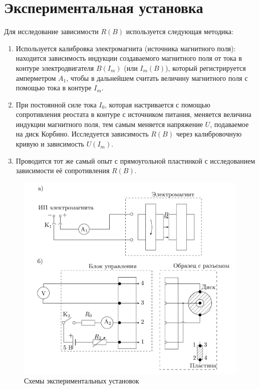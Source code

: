 \documentclass[a4paper, 12pt]{article}%
\begin{document}
\section{Экспериментальная установка}

Для исследование зависимости $R(B)$ используется следующая методика:

\begin{enumerate}
    \item Используется калибровка электромагнита (источника магнитного поля): находится зависимость индукции создаваемого магнитного поля от тока в контуре электродвигателя $B(I_m)$ (или $I_m(B)$), который регистрируется амперметром $A_1$, чтобы в дальнейшем считать величину магнитного поля с помощью тока в контуре $I_m$.
    \item При постоянной силе тока $I_0$, которая настривается с помощью сопротивления реостата в контуре с источником питания, меняется величина индукции магнитного поля, тем самым меняется напряжение $U$, подаваемое на диск Корбино. Исследуется зависимость $R(B)$ через калибровочную кривую и зависимость $U(I_m)$.
    \item Проводится тот же самый опыт с прямоугольной пластинкой с исследованием зависимости её сопротивления $R(B)$.
\end{enumerate}

\begin{figure}[h!]
    \centering
    \includegraphics[width = 13 cm]{images/2.png}
    \caption{Схемы экспериментальных установок}
    \label{scheme}
\end{figure}
\end{document}
